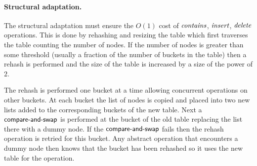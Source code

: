\paragraph{Structural adaptation.}

The structural adaptation must ensure the
$O(1)$ cost of $\ms{contains}$, $\ms{insert}$, $\ms{delete}$ operations.
This is done by rehashing and resizing the table
which first traverses the table counting the number of nodes.
If the number of nodes is greater than some threshold (usually a fraction of the number of buckets in the table) then a rehash is performed and the size of the table is increased by a size of the power of $2$.

The rehash is performed one bucket at a time allowing concurrent operations on other buckets.
At each bucket the list of nodes is copied and placed into two new lists added to the corresponding buckets of the new table.
Next a $\lit{compare-and-swap}$ is performed at the bucket of the old table replacing the list there
with a dummy node.
If the $\lit{compare-and-swap}$ fails then the rehash operation is retried for this bucket.
Any abstract operation that encounters a dummy node then knows that the bucket has been rehashed so
it uses the new table for the operation.

